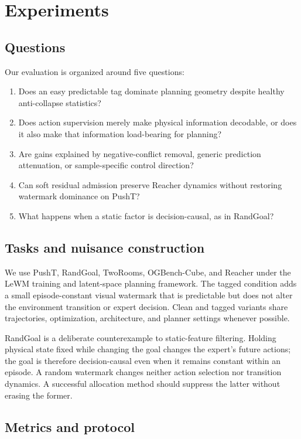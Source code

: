 \section{Experiments}

\subsection{Questions}

Our evaluation is organized around five questions:
\begin{enumerate}
    \item Does an easy predictable tag dominate planning geometry despite
    healthy anti-collapse statistics?
    \item Does action supervision merely make physical information decodable,
    or does it also make that information load-bearing for planning?
    \item Are gains explained by negative-conflict removal, generic prediction
    attenuation, or sample-specific control direction?
    \item Can soft residual admission preserve Reacher dynamics without
    restoring watermark dominance on PushT?
    \item What happens when a static factor is decision-causal, as in RandGoal?
\end{enumerate}

\subsection{Tasks and nuisance construction}

We use PushT, RandGoal, TwoRooms, OGBench-Cube, and Reacher under the LeWM
training and latent-space planning framework.  The tagged condition adds a
small episode-constant visual watermark that is predictable but does not alter
the environment transition or expert decision.  Clean and tagged variants
share trajectories, optimization, architecture, and planner settings whenever
possible.

RandGoal is a deliberate counterexample to static-feature filtering.  Holding
physical state fixed while changing the goal changes the expert's future
actions; the goal is therefore decision-causal even when it remains constant
within an episode.  A random watermark changes neither action selection nor
transition dynamics.  A successful allocation method should suppress the
latter without erasing the former.

\subsection{Metrics and protocol}

